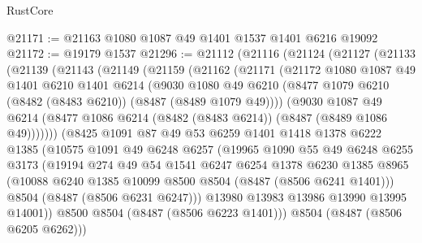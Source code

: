 \begin{lexlean}{RustCore}
\begin{coremodule}
@21171 := @21163 @1080 @1087 @49 @1401 @1537 @1401 @6216 @19092
@21172 := @19179 @1537
@21296 := @21112
    (@21116
      (@21124
        (@21127
          (@21133
            (@21139
              (@21143
                (@21149
                  (@21159
                    (@21162
                      (@21171
                        (@21172
                          @1080
                          @1087
                          @49
                          @1401
                          @6210
                          @1401
                          @6214
                          (@9030
                            @1080
                            @49
                            @6210
                            (@8477 @1079 @6210 (@8482 (@8483 @6210)) (@8487 (@8489 @1079 @49))))
                          (@9030
                            @1087
                            @49
                            @6214
                            (@8477 @1086 @6214 (@8482 (@8483 @6214)) (@8487 (@8489 @1086 @49)))))))
                    (@8425
                      @1091
                      @87
                      @49
                      @53
                      @6259
                      @1401
                      @1418
                      @1378
                      @6222
                      @1385
                      (@10575
                        @1091
                        @49
                        @6248
                        @6257
                        (@19965
                          @1090
                          @55
                          @49
                          @6248
                          @6255
                          @3173
                          (@19194
                            @274
                            @49
                            @54
                            @1541
                            @6247
                            @6254
                            @1378
                            @6230
                            @1385
                            @8965
                            (@10088 @6240 @1385 @10099 @8500 @8504 (@8487 (@8506 @6241 @1401)))
                            @8504
                            (@8487 (@8506 @6231 @6247)))
                          @13980
                          @13983
                          @13986
                          @13990
                          @13995
                          @14001))
                      @8500
                      @8504
                      (@8487 (@8506 @6223 @1401)))
                    @8504
                    (@8487 (@8506 @6205 @6262)))

\end{coremodule}
\end{lexlean}
